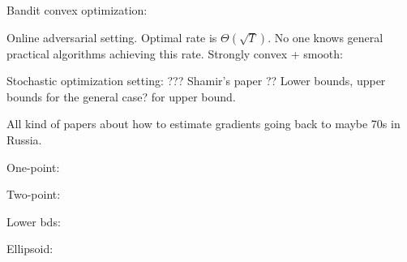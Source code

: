 

Bandit convex optimization:

Online adversarial setting. Optimal rate is $\Theta(\sqrt{T})$.
No one knows general practical algorithms achieving this rate.
Strongly convex + smooth: \cite{hazan2014bandit}

Stochastic optimization setting: ??? Shamir's paper \cite{shamir2012complexity}??
Lower bounds, upper bounds for the general case?
\cite{hazan2014bandit} for upper bound.

All kind of papers about how to estimate gradients going back to maybe 70s in Russia.

One-point: \cite{flaxman2005online}

Two-point: \cite{AgDeXi10}
\cite{duchi2013optimal}

Lower bds: \cite{raginsky2011information} \cite{Chen88:LB-AoS}

Ellipsoid: \cite{AgFoHsuKaRa13:SIAM}


